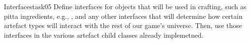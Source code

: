 \documentclass[a4paper, 11pt]{article}
\numberwithin{equation}{section}
\theoremstyle{definition}
\begin{document}
\begin{task}{Interfaces}{task05}
    Define interfaces for objects that will be used in crafting, such as pitta ingredients, e.g., , and any other interfaces that will determine how certain artefact types will interact with the rest of our game's universe. Then, use those interfaces in the various artefact child classes already implemetned.
\end{task}
%
%
%
\end{document}
